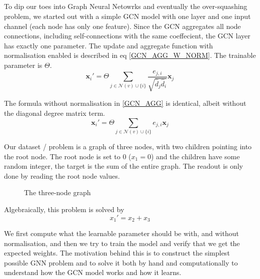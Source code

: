 \documentclass[a4paper,12pt]{article}
\begin{document}
\subsection{}
To dip our toes into Graph Neural Netowrks and eventually the over-squashing problem,
we started out with a simple GCN model with one layer and one input channel (each node has only one feature).
Since the GCN aggregates all node connections, including self-connections with the same coeffecient, the GCN layer has exactly one parameter.
The update and aggregate function with normalisation enabled is described in eq \ref{GCN_AGG_W_NORM}. The trainable parameter is \(\Theta\).
\begin{equation}
  \mathbf{x}_i' = \Theta \sum_{j \in \mathcal{N}(v) \cup \{i\}} \frac{e_{j,i}}{\sqrt{\hat{d}_j \hat{d}_i}} \mathbf{x}_j
  \label{GCN_AGG_W_NORM}
\end{equation}

The formula without normalisation in \ref{GCN_AGG} is identical, albeit without the diagonal degree matrix term.
\begin{equation} \label{GCN_AGG}
  \mathbf{x}_i' = \Theta \sum_{j \in \mathcal{N}(v) \cup \{i\}} e_{j,i} \mathbf{x}_j
\end{equation}

Our dataset / problem is a graph of three nodes, with two children pointing into the root node. The root node is set to 0 (\(x_{1}=0\)) and the children have some random integer, the target is the sum of the entire graph. The readout is only done by reading the root node values.
\begin{figure}[H]
  \centering
{}
\label{fig:three_node_graph}
\caption{The three-node graph}
\end{figure}

Algebraically, this problem is solved by
\begin{equation}
x_{1}' = x_{2}+x_{3} \label{three_node_analytical_view}
\end{equation}


We first compute what the learnable parameter should be with, and without normalisation, and then we try to train the model and verify that we get the expected weights. The motivation behind this is to construct the simplest possible GNN problem and to solve it both by hand and computationally to understand how the GCN model works and how it learns.
\end{document}
